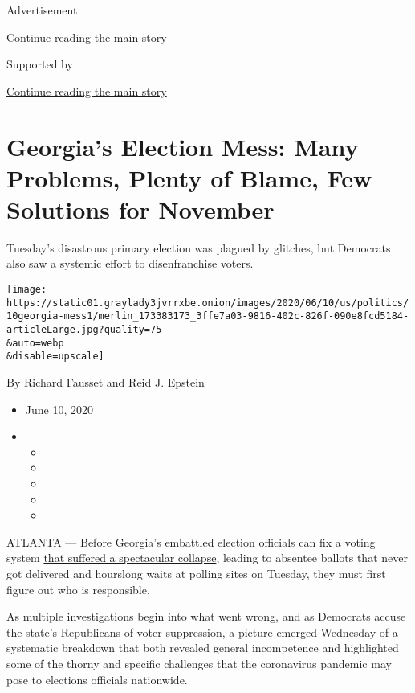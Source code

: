 Advertisement

\protect\hyperlink{after-top}{Continue reading the main story}

Supported by

\protect\hyperlink{after-sponsor}{Continue reading the main story}

\hypertarget{georgias-election-mess-many-problems-plenty-of-blame-few-solutions-for-november}{%
\section{Georgia's Election Mess: Many Problems, Plenty of Blame, Few
Solutions for
November}\label{georgias-election-mess-many-problems-plenty-of-blame-few-solutions-for-november}}

Tuesday's disastrous primary election was plagued by glitches, but
Democrats also saw a systemic effort to disenfranchise voters.

\texttt{[image: https://static01.graylady3jvrrxbe.onion/images/2020/06/10/us/politics/10georgia-mess1/merlin\_173383173\_3ffe7a03-9816-402c-826f-090e8fcd5184-articleLarge.jpg?quality=75\\\&auto=webp\\\&disable=upscale]}

By \href{https://www.nytimes3xbfgragh.onion/by/richard-fausset}{Richard
Fausset} and
\href{https://www.nytimes3xbfgragh.onion/by/reid-j-epstein}{Reid J.
Epstein}

\begin{itemize}
\item
  June 10, 2020
\item
  \begin{itemize}
  \item
  \item
  \item
  \item
  \item
  \end{itemize}
\end{itemize}

ATLANTA --- Before Georgia's embattled election officials can fix a
voting system
\href{https://www.nytimes3xbfgragh.onion/2020/06/09/us/politics/atlanta-voting-georgia-primary.html}{that
suffered a spectacular collapse}, leading to absentee ballots that never
got delivered and hourslong waits at polling sites on Tuesday, they must
first figure out who is responsible.

As multiple investigations begin into what went wrong, and as Democrats
accuse the state's Republicans of voter suppression, a picture emerged
Wednesday of a systematic breakdown that both revealed general
incompetence and highlighted some of the thorny and specific challenges
that the coronavirus pandemic may pose to elections officials
nationwide.

